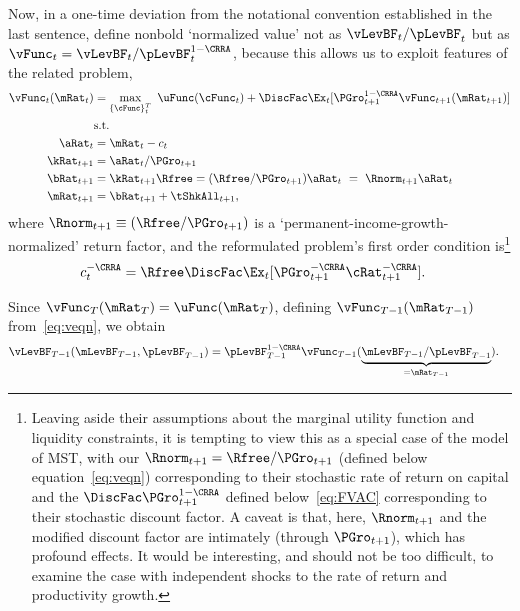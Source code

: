 \documentclass[ProjectDLO]{subfiles}
\begin{document}
Now, in a one-time deviation from the notational convention established in the last sentence, define nonbold `normalized value' not as $\vLevBF_{t}/\pLevBF_{t}$ but as $\vFunc_{t} = \vLevBF_{t}/\pLevBF_{t}^{1-\CRRA}$, because this allows us to exploit features of the related problem,
\begin{align}
  \vFunc_{t}(\mRat_{t})  & = \max_{{\{\cFunc\}}_{t}^{T}}~  \uFunc(\cFunc_{t}) +\DiscFac \Ex_{t}[\PGro_{t+1}^{1-\CRRA}\vFunc_{t+1}({\mRat}_{t+1})] \notag \\
                         & \mbox{s.t.}  \label{eq:veqn}
  \\ {\aRat}_{t}  & = \mRat_{t}-c_{t}  \notag
  \\ {\kRat}_{t+1} & = \aRat_{t}/\PGro_{t+1}  \notag
  \\ {\bRat}_{t+1}  & = {\kRat}_{t+1}\Rfree = (\Rfree/\PGro_{t+1})\aRat_{t}  ~ = ~ \Rnorm_{t+1}\aRat_{t}  \notag
  \\ \mRat_{t+1}  & = \bRat_{t+1}+\tShkAll_{t+1}  \notag, %
\end{align}
where $\Rnorm_{t+1}\equiv (\Rfree/\PGro_{t+1})$ is a `permanent-income-growth-normalized' return factor, and the reformulated problem's first order condition is\footnote{Leaving aside their assumptions about the marginal utility function and liquidity constraints, it is tempting to view this as a special case of the model of MST, with our $\Rnorm_{t+1}=\Rfree/\PGro_{t+1}$ (defined below equation~\eqref{eq:veqn}) corresponding to their stochastic rate of return on capital and the {\FVAF} $\DiscFac \PGro_{t+1}^{1-\CRRA}$ defined below~\eqref{eq:FVAC} corresponding to their stochastic discount factor.  A caveat is that, here, $\Rnorm_{t+1}$ and the modified discount factor are intimately (through $\PGro_{t+1}$), which has profound effects.  It would be interesting, and should not be too difficult, to examine the case with independent shocks to the rate of return and productivity growth.}
\begin{align}
  c_{t}^{-\CRRA}  & = \Rfree \DiscFac \Ex_{t}[ {\PGro}_{t+1}^{-\CRRA} {\cRat}
                    _{t+1}^{-\CRRA}].  \label{eq:scaledeuler}
\end{align}

Since $\vFunc_{T}(\mRat_{T}) = \uFunc(\mRat_{T})$, defining $\vFunc_{T-1}(\mRat_{T-1})$ from~\eqref{eq:veqn}, we obtain
\begin{align*}
  \vLevBF_{T-1}(\mLevBF_{T-1},\pLevBF_{T-1})  & = \pLevBF_{T-1}^{1-\CRRA} \vFunc_{T-1}(\underbrace{\mLevBF_{T-1}/\pLevBF_{T-1}}_{=\mRat_{T-1}}).
\end{align*}
\end{document}
